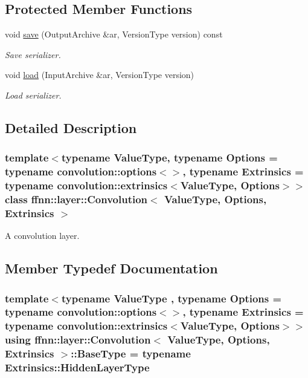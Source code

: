 \subsection*{Protected Member Functions}
\begin{DoxyCompactItemize}
\item 
void \hyperlink{classffnn_1_1layer_1_1_convolution_a06e3973928e3b0f7ef8b0c7aabcf93c8}{save} (Output\-Archive \&ar, Version\-Type version) const 
\begin{DoxyCompactList}\small\item\em Save serializer. \end{DoxyCompactList}\item 
void \hyperlink{classffnn_1_1layer_1_1_convolution_af002187ef6ca18c4071d88c9fb1bb002}{load} (Input\-Archive \&ar, Version\-Type version)
\begin{DoxyCompactList}\small\item\em Load serializer. \end{DoxyCompactList}\end{DoxyCompactItemize}


\subsection{Detailed Description}
\subsubsection*{template$<$typename Value\-Type, typename Options = typename convolution\-::options$<$$>$, typename Extrinsics = typename convolution\-::extrinsics$<$\-Value\-Type, Options$>$$>$class ffnn\-::layer\-::\-Convolution$<$ Value\-Type, Options, Extrinsics $>$}

A convolution layer. 

\subsection{Member Typedef Documentation}
\hypertarget{classffnn_1_1layer_1_1_convolution_a30a3026202f29a601e539c80824fcf1f}{
\subsubsection[{Base\-Type}]{\setlength{\rightskip}{0pt plus 5cm}template$<$typename Value\-Type , typename Options  = typename convolution\-::options$<$$>$, typename Extrinsics  = typename convolution\-::extrinsics$<$\-Value\-Type, Options$>$$>$ using {\bf ffnn\-::layer\-::\-Convolution}$<$ Value\-Type, Options, Extrinsics $>$\-::{\bf Base\-Type} =  typename Extrinsics\-::\-Hidden\-Layer\-Type}}\label{classffnn_1_1layer_1_1_convolution_a30a3026202f29a601e539c80824fcf1f}


